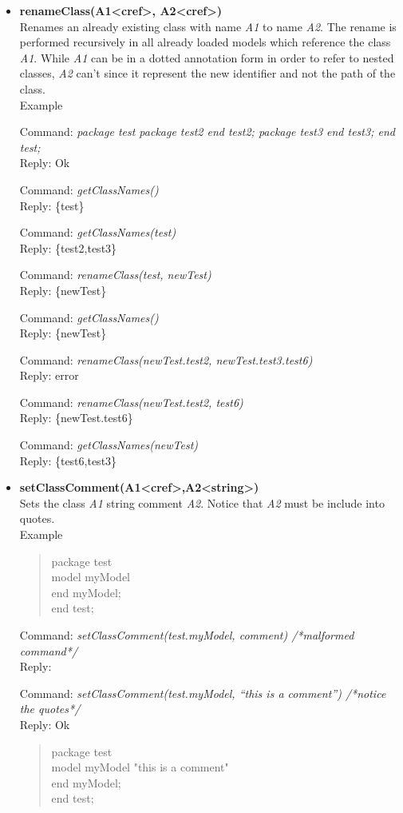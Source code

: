 \documentclass[11pt,a4paper,oneside,english]{book}
\newenvironment{modelicaExamples}{\begin{itemize}}{\end{itemize}}
\newcommand{\api}[2]{\item \textbf{#1} \\ #2}
\newcommand{\tab}{\hspace{2em}}
\newcommand{\command}[1]{Command: \textit{#1}\\}
\newcommand{\reply}[1]{Reply: #1}
\newcommand{\functionex}[2]{\begin{singlespace} \command{#1} \reply{#2} \end{singlespace}}
\newcommand{\examples}{Example}
\newenvironment{mocode}{\begin{verse}\begin{singlespace}\begin{scriptsize}\ttfamily}{\end{scriptsize}\end{singlespace}\end{verse}}
\begin{document}
\begin{modelicaExamples}
{		\functionex{deleteClass(test)}
		{true}

		\functionex{getClassNames()}
		{\{\}}
		}

		\api{renameClass(A1<cref>, A2<cref>)}{Renames an already existing class with name \textit{A1} to name \textit{A2}. The rename is performed recursively in all already loaded models which reference the class \textit{A1}.
		While \textit{A1} can be in a dotted annotation form in order to refer to nested classes, \textit{A2} can't since it represent the new identifier and not the path of the class.\\
		\examples
		\functionex{package test package test2 end test2; package test3 end test3; end test;}
		{Ok}

		\functionex{getClassNames()}
		{\{test\}}

		\functionex{getClassNames(test)}
		{\{test2,test3\}}

		\functionex{renameClass(test, newTest)}
		{\{newTest\}}

		\functionex{getClassNames()}
		{\{newTest\}}

		\functionex{renameClass(newTest.test2, newTest.test3.test6)}
		{error}

		\functionex{renameClass(newTest.test2, test6)}
		{\{newTest.test6\}}

		\functionex{getClassNames(newTest)}
		{\{test6,test3\}}

		}

		\api{setClassComment(A1<cref>,A2<string>)}{Sets the class \textit{A1} string comment \textit{A2}.
		Notice that \textit{A2} must be include into quotes.\\
		\examples
		\begin{mocode}
		 package test \\
		 \tab model myModel \\
		\tab end myModel; \\
		end test; \\
		\end{mocode}
		\functionex{setClassComment(test.myModel, comment)  /*malformed command*/}
		{}

		\functionex{setClassComment(test.myModel, ``this is a comment'') /*notice the quotes*/}
		{Ok}
		\begin{mocode}
		package test \\
		\tab model myModel "this is a comment" \\
		\tab end myModel; \\
		end test; \\
		\end{mocode}

}
\end{modelicaExamples}
\end{document}

